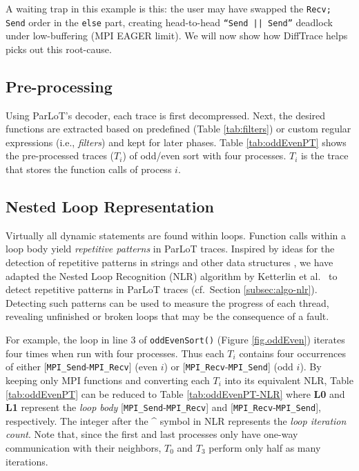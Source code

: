 A waiting trap in this example is this: the user may have
swapped the {\tt Recv; Send} order in the {\tt else} part,
creating head-to-head {\tt ``Send || Send''} deadlock
under low-buffering (MPI EAGER limit).
%
We will now show how DiffTrace helps picks out this root-cause.

\subsection{Pre-processing}

Using ParLoT's decoder, each trace is first decompressed.
Next, the desired functions are extracted based on predefined
(Table \ref{tab:filters}) or custom regular expressions
(i.e., \textit{filters}) and kept for later phases.
%
Table \ref{tab:oddEvenPT} shows the pre-processed traces ($T_i$) of odd/even sort with four processes.
$T_i$ is the trace that stores the function calls of process $i$.






\subsection{Nested Loop Representation}

Virtually all dynamic statements are found within loops.
%
Function calls within a loop body yield \textit{repetitive patterns}
in ParLoT traces.
%
Inspired by ideas for the detection of repetitive patterns in strings \cite{nakamura_fast_2013}
and other data structures \cite{kmr},
we have adapted the Nested Loop Recognition (NLR) algorithm by Ketterlin et al.~\cite{Ketterlin-nlr}
to detect repetitive patterns in ParLoT traces (cf.~Section \ref{subsec:algo-nlr}).
Detecting such patterns can be used to measure the progress of each thread,
revealing unfinished or broken loops that may be the consequence of a fault.

For example, the loop in line 3 of \texttt{oddEvenSort()} (Figure \ref{fig.oddEven}) iterates
four times when run with four processes.
Thus each $T_i$ contains four occurrences of either [\texttt{MPI\_Send}-\texttt{MPI\_Recv}] (even $i$)
or [\texttt{MPI\_Recv}-\texttt{MPI\_Send}] (odd $i$).
By keeping only MPI functions and converting each $T_i$ into its equivalent NLR,
Table \ref{tab:oddEvenPT} can be reduced to Table \ref{tab:oddEvenPT-NLR} where \textbf{L0} and \textbf{L1}
represent the \textit{loop body} [\texttt{MPI\_Send}-\texttt{MPI\_Recv}] and
[\texttt{MPI\_Recv}-\texttt{MPI\_Send}], respectively.
The integer after the \^{} symbol in NLR represents the \textit{loop iteration count}.
Note that, since the first and last processes only have one-way communication with their neighbors,
$T_0$ and $T_3$ perform only half as many iterations.


